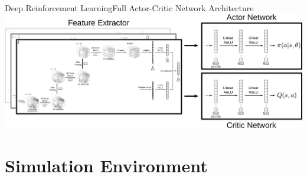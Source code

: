 \begin{frame}{Deep Reinforcement Learning}{Full Actor-Critic Network Architecture}
    \centering
    \includegraphics[width=\textwidth]{graphics/actor_critic_network_full.pdf}
\end{frame}

\section{Simulation Environment}

